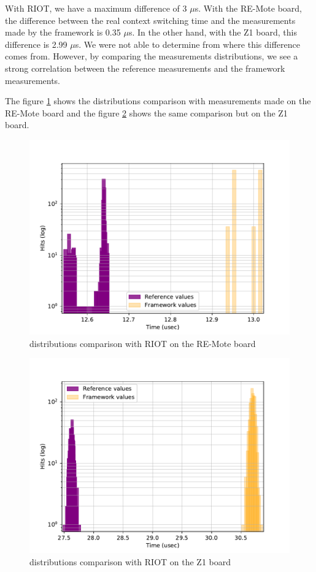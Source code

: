 With RIOT, we have a maximum difference of 3 $\mu$s.
With the RE-Mote board, the difference between the real context switching time and the measurements made by the framework is 0.35 $\mu$s.
In the other hand, with the Z1 board, this difference is 2.99 $\mu$s.
We were not able to determine from where this difference comes from.
However, by comparing the measurements distributions, we see a strong correlation between the reference measurements and the framework measurements.

The figure \ref{fig:devices-comparison-riot-remote} shows the distributions comparison with measurements made on the RE-Mote board and the figure \ref{fig:devices-comparison-riot-z1} shows the same comparison but on the Z1 board.

\begin{figure}[!ht]
  \centering
  \includegraphics[scale=.7]{assets/comparison-devices-framework-riot-remote.pdf}
  \caption{distributions comparison with RIOT on the RE-Mote board\label{fig:devices-comparison-riot-remote}}
\end{figure}

\begin{figure}[!ht]
  \centering
  \includegraphics[scale=.7]{assets/comparison-devices-framework-riot-z1.pdf}
  \caption{distributions comparison with RIOT on the Z1 board\label{fig:devices-comparison-riot-z1}}
\end{figure}